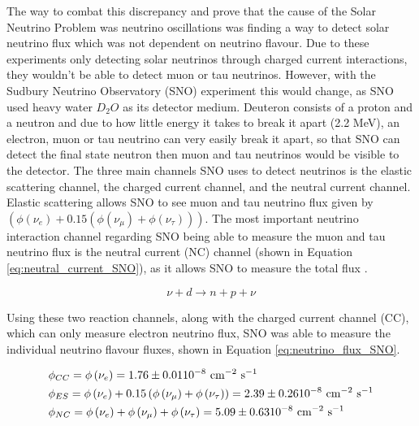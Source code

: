 The way to combat this discrepancy and prove that the cause of the Solar Neutrino Problem was neutrino oscillations was finding a way to detect solar neutrino flux which was not dependent on neutrino flavour. Due to these experiments only detecting solar neutrinos through charged current interactions, they wouldn't be able to detect muon or tau neutrinos. However, with the Sudbury Neutrino Observatory (SNO) experiment this would change, as SNO used heavy water $D_{2}O$ as its detector medium. Deuteron consists of a proton and a neutron and due to how little energy it takes to break it apart (2.2 MeV), an electron, muon or tau neutrino can very easily break it apart, so that SNO can detect the final state neutron then muon and tau neutrinos would be visible to the detector. The three main channels SNO uses to detect neutrinos is the elastic scattering channel, the charged current channel, and the neutral current channel. Elastic scattering allows SNO to see muon and tau neutrino flux given by $(\phi(\nu_{e}) + 0.15(\phi(\nu_{\mu}) + \phi(\nu_{\tau})))$. The most important neutrino interaction channel regarding SNO being able to measure the muon and tau neutrino flux is the neutral current (NC) channel (shown in Equation \ref{eq:neutral_current_SNO}), as it allows SNO to measure the total flux \cite{krastev2002global}.

\begin{equation}
    \nu + d \rightarrow n + p + \nu
\label{eq:neutral_current_SNO}
\end{equation}

Using these two reaction channels, along with the charged current channel (CC), which can only measure electron neutrino flux, SNO was able to measure the individual neutrino flavour fluxes, shown in Equation \ref{eq:neutrino_flux_SNO}. 


\begin{align}
&\phi_{C C}=\phi\left(\nu_{e}\right)=1.76 \pm 0.01  \mathrm{  10^{-8}} \mathrm{~cm}^{-2} \mathrm{~s}^{-1} \label{eq:neutrino_flux_SNO}\\
&\phi_{E S}=\phi\left(\nu_{e}\right)+0.15\left(\phi\left(\nu_{\mu}\right)+\phi\left(\nu_{\tau}\right)\right)=2.39 \pm 0.26  \mathrm{  10^{-8}} \mathrm{~cm}^{-2} \mathrm{~s}^{-1} \notag\\
&\phi_{N C}=\phi\left(\nu_{e}\right)+\phi\left(\nu_{\mu}\right)+\phi\left(\nu_{\tau}\right) = 5.09 \pm 0.63  \mathrm{  10^{-8}} \mathrm{~cm}^{-2} \mathrm{~s}^{-1} \notag
\end{align}


